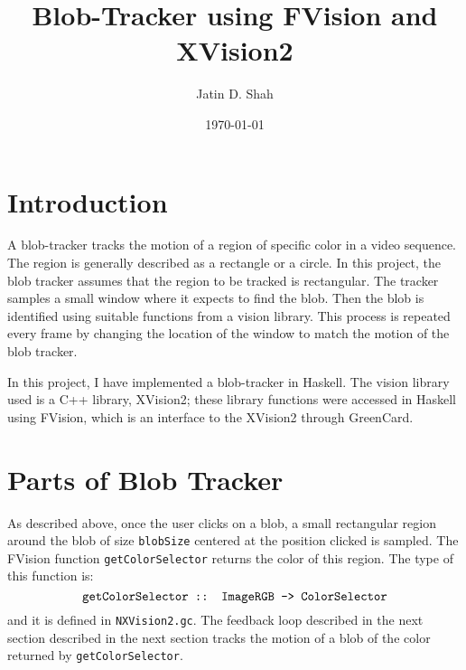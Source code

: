 \documentclass[12pt]{article}
\title{Blob-Tracker using FVision and XVision2}
\author{Jatin D. Shah}
\date{\today}
\begin{document}
\maketitle
\section{Introduction}
\par A blob-tracker tracks the motion of a region of specific color in a video sequence. The region is generally described as a rectangle or a circle. In this project, the blob tracker assumes that the region to be tracked is rectangular. The tracker samples a small window where it expects to find the blob. Then the blob is identified using suitable functions from a vision library. This process is repeated every frame by changing the location of the window to match the motion of the blob tracker. 
\par In this project, I have implemented a blob-tracker in Haskell. The vision library used is a C++ library, XVision2; these library functions were accessed in Haskell using FVision, which is an interface to the XVision2 through GreenCard.
\section{Parts of Blob Tracker}
\par As described above, once the user clicks on a blob, a small rectangular region around the blob of size {\tt blobSize} centered at the position clicked is sampled. The FVision function {\tt getColorSelector} returns the color of this region. The type of this function is: $$\mbox{\tt getColorSelector :: ImageRGB -> ColorSelector}$$ and it is defined in {\tt NXVision2.gc}. The feedback loop described in the next section described in the next section tracks the motion of a blob of the color returned by {\tt getColorSelector}.
\end{document}
